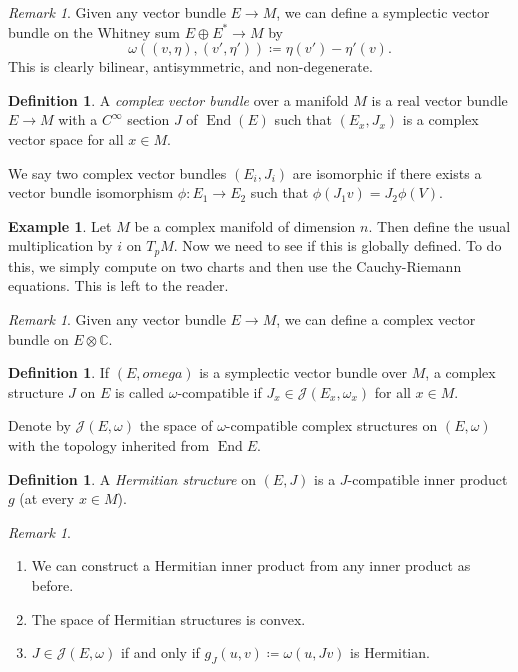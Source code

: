 \documentclass[leqno, openany]{memoir}
\theoremstyle{definition}
\newtheorem{defn}[thm]{Definition}
\newtheorem{exm}[thm]{Example}
\theoremstyle{remark}
\newtheorem{rmk}[thm]{Remark}
\theoremstyle{plain}
\theoremstyle{definition}
\theoremstyle{remark}
\renewcommand{\C}{\mathbb{C}}
\newcommand{\mc}[1]{\mathcal{#1}}
\DeclareMathOperator{\End}{End}
\begin{document}
\begin{rmk}
    Given any vector bundle $E \to M$, we can define a symplectic vector bundle on the Whitney sum $E \oplus E^* \to M$ by 
    \[ \omega((v, \eta), (v', \eta')) \coloneqq \eta(v') - \eta'(v). \]
    This is clearly bilinear, antisymmetric, and non-degenerate.
\end{rmk}

\begin{defn}
    A \textit{complex vector bundle} over a manifold $M$ is a real vector bundle $E \to M$ with a $C^{\infty}$ section $J$ of $\End(E)$ such that $(E_x, J_x)$ is a complex vector space for all $x \in M$.
\end{defn}
We say two complex vector bundles $(E_i, J_i)$ are isomorphic if there exists a vector bundle isomorphism $\phi: E_1 \to E_2$ such that $\phi(J_1 v) = J_2 \phi(V)$.

\begin{exm}
    Let $M$ be a complex manifold of dimension $n$. Then define the usual multiplication by $i$ on $T_pM$. Now we need to see if this is globally defined. To do this, we simply compute on two charts and then use the Cauchy-Riemann equations. This is left to the reader.
\end{exm}

\begin{rmk}
    Given any vector bundle $E \to M$, we can define a complex vector bundle on $E \otimes \C$.
\end{rmk}

\begin{defn}
    If $(E, omega)$ is a symplectic vector bundle over $M$, a complex structure $J$ on $E$ is called $\omega$-compatible if $J_x \in \mc{J}(E_x, \omega_x)$ for all $x \in M$.
\end{defn}
Denote by $\mc{J}(E, \omega)$ the space of $\omega$-compatible complex structures on $(E, \omega)$ with the topology inherited from $\End E$.
\begin{defn}
    A \textit{Hermitian structure} on $(E, J)$ is a $J$-compatible inner product $g$ (at every $x \in M$).
\end{defn}
\begin{rmk}
    \begin{enumerate}
        \item We can construct a Hermitian inner product from any inner product as before.
        \item The space of Hermitian structures is convex.
        \item $J \in \mc{J}(E, \omega)$ if and only if $g_J(u,v) \coloneqq \omega(u, Jv)$ is Hermitian.
    \end{enumerate}
\end{rmk}
\end{document}
